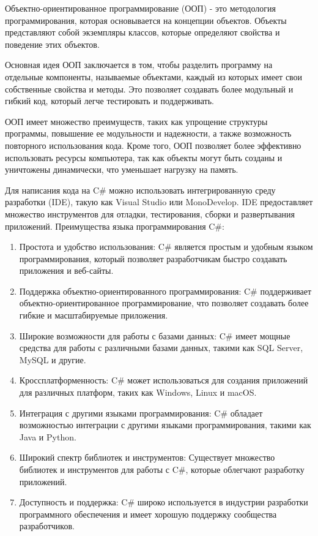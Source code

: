 \documentclass[a4paper,14pt, Times New Roman]{extarticle}
\begin{document}
Объектно-ориентированное программирование (ООП) - это методология программирования, которая основывается на концепции объектов. Объекты представляют собой экземпляры классов, которые определяют свойства и поведение этих объектов.

Основная идея ООП заключается в том, чтобы разделить программу на отдельные компоненты, называемые объектами, каждый из которых имеет свои собственные свойства и методы. Это позволяет создавать более модульный и гибкий код, который легче тестировать и поддерживать.

ООП имеет множество преимуществ, таких как упрощение структуры программы, повышение ее модульности и надежности, а также возможность повторного использования кода. Кроме того, ООП позволяет более эффективно использовать ресурсы компьютера, так как объекты могут быть созданы и уничтожены динамически, что уменьшает нагрузку на память.

Для написания кода на C\# можно использовать интегрированную среду разработки (IDE), такую как Visual Studio или MonoDevelop. IDE предоставляет множество инструментов для отладки, тестирования, сборки и развертывания приложений.
Преимущества языка программирования C\#:

\begin{enumerate}
  \item Простота и удобство использования: C\# является простым и удобным языком программирования, который позволяет разработчикам быстро создавать приложения и веб-сайты.
  \item Поддержка объектно-ориентированного программирования: C\# поддерживает объектно-ориентированное программирование, что позволяет создавать более гибкие и масштабируемые приложения.
  \item Широкие возможности для работы с базами данных: C\# имеет мощные средства для работы с различными базами данных, такими как SQL Server, MySQL и другие.
  \item Кроссплатформенность: C\# может использоваться для создания приложений для различных платформ, таких как Windows, Linux и macOS.
  \item Интеграция с другими языками программирования: C\# обладает возможностью интеграции с другими языками программирования, такими как Java и Python.
  \item Широкий спектр библиотек и инструментов: Существует множество библиотек и инструментов для работы с C\#, которые облегчают разработку приложений.
  \item Доступность и поддержка: C\# широко используется в индустрии разработки программного обеспечения и имеет хорошую поддержку сообщества разработчиков.
\end{enumerate}
\end{document}
